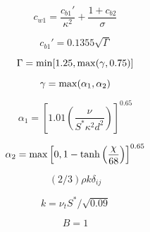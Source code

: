 \begin{equation}
c_{w1} = \frac{c_{b1}'}{\kappa^2} + \frac{1+c_{b2}}{\sigma}
\end{equation}

\begin{equation}
c_{b1}' = 0.1355 \sqrt{\Gamma}
\end{equation}

\begin{equation}
\Gamma = {\rm min}[1.25, {\rm max} (\gamma, 0.75)]
\end{equation}

\begin{equation}
\gamma = {\rm max}(\alpha_1, \alpha_2)
\end{equation}

\begin{equation}
\alpha_1 = \left[1.01 \left( \frac{\hat \nu}{S^* \kappa^2 d^2} \right) \right]^{0.65}
\end{equation}

\begin{equation}
\alpha_2 = {\rm max} \left[ 0,1-{\rm tanh} \left( \frac{\chi}{68} \right) \right]^{0.65}
\end{equation}

\begin{equation}
(2/3)\rho k \delta_{ij}
\end{equation}

\begin{equation}
k = \nu_t S^* / \sqrt{0.09}
\end{equation}

\begin{equation}
B=1
\end{equation}


